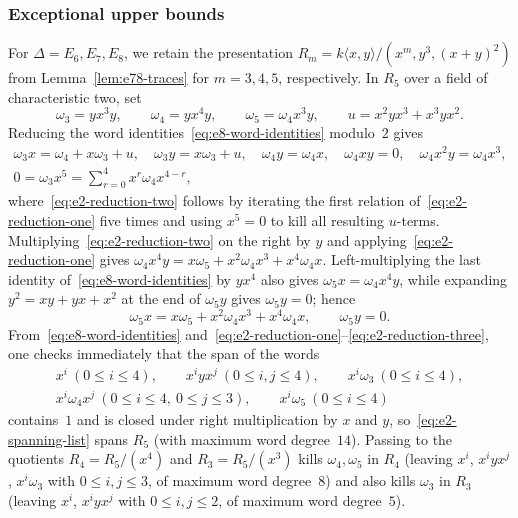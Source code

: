 \subsubsection{Exceptional upper bounds}

For $\Delta=E_6,E_7,E_8$, we retain the presentation $R_m=k\langle x,y\rangle/(x^m,y^3,(x+y)^2)$ from Lemma~\ref{lem:e78-traces} for $m=3,4,5$, respectively. In $R_5$ over a field of characteristic two, set
\[
  \omega_3=yx^3y,\qquad \omega_4=yx^4y,\qquad \omega_5=\omega_4 x^3y,\qquad u=x^2yx^3+x^3yx^2.
\]
Reducing the word identities~\eqref{eq:e8-word-identities} modulo~$2$ gives
\begin{gather}
  \omega_3 x=\omega_4+x\omega_3+u,\quad \omega_3 y=x\omega_3+u,\quad
  \omega_4 y=\omega_4 x,\quad \omega_4 xy=0,\quad \omega_4 x^2y=\omega_4 x^3,
  \label{eq:e2-reduction-one}\\
  0=\omega_3 x^5=\sum_{r=0}^4 x^r\omega_4 x^{4-r},
  \label{eq:e2-reduction-two}
\end{gather}
where~\eqref{eq:e2-reduction-two} follows by iterating the first relation of~\eqref{eq:e2-reduction-one} five times and using $x^5=0$ to kill all resulting $u$-terms. Multiplying~\eqref{eq:e2-reduction-two} on the right by $y$ and applying~\eqref{eq:e2-reduction-one} gives $\omega_4 x^4y=x\omega_5+x^2\omega_4 x^3+x^4\omega_4 x$. Left-multiplying the last identity of~\eqref{eq:e8-word-identities} by $yx^4$ also gives $\omega_5 x=\omega_4 x^4y$, while expanding $y^2=xy+yx+x^2$ at the end of $\omega_5 y$ gives $\omega_5 y=0$; hence
\begin{equation}
  \omega_5 x=x\omega_5+x^2\omega_4 x^3+x^4\omega_4 x,\qquad \omega_5 y=0.
  \label{eq:e2-reduction-three}
\end{equation}
From~\eqref{eq:e8-word-identities} and~\eqref{eq:e2-reduction-one}--\eqref{eq:e2-reduction-three}, one checks immediately that the span of the words
\begin{equation}
  \label{eq:e2-spanning-list}
  \begin{gathered}
  x^i\ (0\leq i\leq4),\qquad
  x^iyx^j\ (0\leq i,j\leq4),\qquad
  x^i\omega_3\ (0\leq i\leq4),\\
  x^i\omega_4 x^j\ (0\leq i\leq4,\ 0\leq j\leq3),\qquad
  x^i\omega_5\ (0\leq i\leq4)
  \end{gathered}
\end{equation}
contains~$1$ and is closed under right multiplication by $x$ and $y$, so~\eqref{eq:e2-spanning-list} spans $R_5$ (with maximum word degree~$14$). Passing to the quotients $R_4=R_5/(x^4)$ and $R_3=R_5/(x^3)$ kills $\omega_4,\omega_5$ in $R_4$ (leaving $x^i$, $x^iyx^j$, $x^i\omega_3$ with $0\leq i,j\leq3$, of maximum word degree~$8$) and also kills $\omega_3$ in $R_3$ (leaving $x^i$, $x^iyx^j$ with $0\leq i,j\leq2$, of maximum word degree~$5$).

